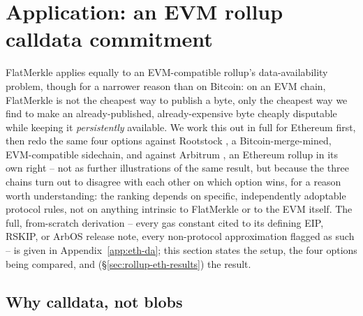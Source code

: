 \section{Application: an EVM rollup calldata commitment}
\label{sec:rollup-eth}

FlatMerkle applies equally to an EVM-compatible rollup's data-availability
problem, though for a narrower reason than on Bitcoin: on an EVM chain,
FlatMerkle is not the cheapest way to publish a byte, only the cheapest way
we find to make an already-published, already-expensive byte cheaply
disputable while keeping it \emph{persistently} available. We work this out
in full for Ethereum first, then redo the same four options against
Rootstock \citep{rsk2022}, a Bitcoin-merge-mined, EVM-compatible sidechain,
and against Arbitrum \citep{arbos40}, an Ethereum rollup in its own right --
not as further illustrations of the same result, but because the three
chains turn out to disagree with each other on which option wins, for a
reason worth understanding: the ranking depends on specific,
independently adoptable protocol rules, not on anything intrinsic to
FlatMerkle or to the EVM itself. The full, from-scratch derivation --
every gas constant cited to its defining EIP, RSKIP, or ArbOS release
note, every non-protocol approximation flagged as such -- is given in
Appendix~\ref{app:eth-da}; this section states the setup, the four
options being compared, and (\S\ref{sec:rollup-eth-results}) the result.

\subsection{Why calldata, not blobs}
\label{sec:rollup-eth-setup}

